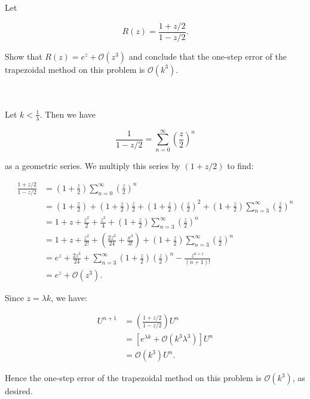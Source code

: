 Let 

$$
R(z) = \frac{1 + z/2}{1 - z/2}.
$$

Show that $R(z) = e^z + \mathcal{O}(z^3)$ and conclude that the one-step error of the trapezoidal method on this problem
is $\mathcal{O}(k^3)$.

\begin{solution}\ \\\\
    Let $k < \frac{1}{\lambda}$. Then we have

    $$
    \frac{1}{1 - z/2} = \sum\limits_{n=0}^{\infty}{\left(\frac{z}{2}\right)^n}
    $$

    as a geometric series. We multiply this series by $(1 + z/2)$ to find:

    \begin{align*}
    \frac{1 + z/2}{1 - z/2} &= \left(1 + \frac{z}{2}\right) \sum\limits_{n=0}^{\infty}{\left(\frac{z}{2}\right)^n} \\
                            &= \left(1 + \frac{z}{2}\right) 
                             + \left(1 + \frac{z}{2}\right) \frac{z}{2} 
                             + \left(1 + \frac{z}{2}\right) \left(\frac{z}{2} \right)^2 
                             + \left(1 + \frac{z}{2}\right) \sum\limits_{n=3}^{\infty}{\left(\frac{z}{2}\right)^n} \\
                            &= 1 + z + \frac{z^2}{2} + \frac{z^3}{4}  
                             + \left(1 + \frac{z}{2}\right) \sum\limits_{n=3}^{\infty}{\left(\frac{z}{2}\right)^n} \\
                            &= 1 + z + \frac{z^2}{2!} + \left( \frac{2z^3}{24} + \frac{x^3}{3!} \right)
                             + \left(1 + \frac{z}{2}\right) \sum\limits_{n=3}^{\infty}{\left(\frac{z}{2}\right)^n} \\
                            &= e^z + \frac{2z^3}{24} 
                             + \sum\limits_{n=3}^{\infty}{\left(1 + \frac{z}{2}\right) \left(\frac{z}{2}\right)^n - \frac{z^{n+1}}{(n+1)!}} \\
                            &= e^z + \mathcal{O}(z^3).
    \end{align*}

    Since $z = \lambda k$, we have:

    \begin{align*}
    U^{n+1} &= \left( \frac{1 + z/2}{1 - z/2} \right) U^n \\
            &= \left[e^{\lambda k} + \mathcal{O}\left( k^3 \lambda^3 \right)\right] U^n \\
            &= \mathcal{O}\left( k^3 \right) U^n.
    \end{align*}

    Hence the one-step error of the trapezoidal method on this problem is $\mathcal{O}(k^3)$, as desired.
    \ \\
\end{solution}